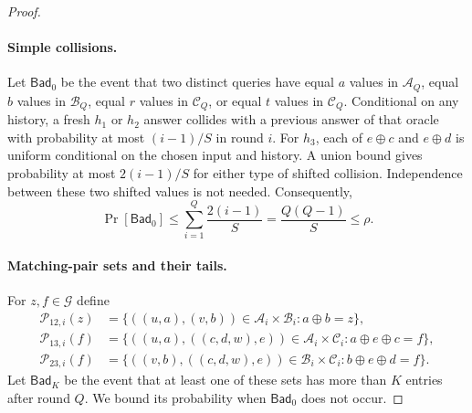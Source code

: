 \documentclass[11pt,letterpaper]{article}
\theoremstyle{definition} %
\begin{document}
\begin{proof}
\paragraph{Simple collisions.}
Let $\mathsf{Bad}_0$ be the event that two distinct queries have equal
$a$ values in $\mathcal{A}_Q$, equal $b$ values in $\mathcal{B}_Q$,
equal $r$ values in $\mathcal{C}_Q$, or equal $t$ values in
$\mathcal{C}_Q$. Conditional on any history, a fresh $h_1$ or $h_2$
answer collides with a previous answer of that oracle with probability
at most $(i-1)/S$ in round $i$. For $h_3$, each of $e\oplus c$ and
$e\oplus d$ is uniform conditional on the chosen input and history.
A union bound gives probability at most $2(i-1)/S$ for either type
of shifted collision. Independence between these two shifted values
is not needed. Consequently,
\begin{equation}
 \Pr[\mathsf{Bad}_0]
 \leq\sum_{i=1}^{Q}\frac{2(i-1)}{S}
 =\frac{Q(Q-1)}{S}\leq\rho.
 \label{eq:t5-simple-collisions}
\end{equation}

\paragraph{Matching-pair sets and their tails.}
For $z,f\in\mathcal{G}$ define
\begin{align*}
 \mathcal{P}_{12,i}(z)
 &=\{((u,a),(v,b))\in\mathcal{A}_i\times\mathcal{B}_i:
          a\oplus b=z\},\\
 \mathcal{P}_{13,i}(f)
 &=\{((u,a),((c,d,w),e))\in\mathcal{A}_i\times\mathcal{C}_i:
          a\oplus e\oplus c=f\},\\
 \mathcal{P}_{23,i}(f)
 &=\{((v,b),((c,d,w),e))\in\mathcal{B}_i\times\mathcal{C}_i:
          b\oplus e\oplus d=f\}.
\end{align*}
Let $\mathsf{Bad}_K$ be the event that at least one of these sets has
more than $K$ entries after round $Q$. We bound its probability when
$\mathsf{Bad}_0$ does not occur.


\end{proof}
\end{document}
